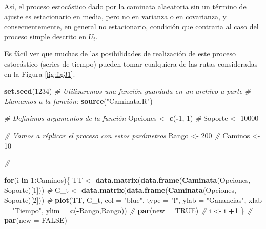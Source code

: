 \documentclass[
]{book}
\newenvironment{Shaded}{\begin{snugshade}}{\end{snugshade}}
\newcommand{\AttributeTok}[1]{\textcolor[rgb]{0.13,0.29,0.53}{#1}}
\newcommand{\CommentTok}[1]{\textcolor[rgb]{0.56,0.35,0.01}{\textit{#1}}}
\newcommand{\ConstantTok}[1]{\textcolor[rgb]{0.56,0.35,0.01}{#1}}
\newcommand{\ControlFlowTok}[1]{\textcolor[rgb]{0.13,0.29,0.53}{\textbf{#1}}}
\newcommand{\DecValTok}[1]{\textcolor[rgb]{0.00,0.00,0.81}{#1}}
\newcommand{\FunctionTok}[1]{\textcolor[rgb]{0.13,0.29,0.53}{\textbf{#1}}}
\newcommand{\NormalTok}[1]{#1}
\newcommand{\OtherTok}[1]{\textcolor[rgb]{0.56,0.35,0.01}{#1}}
\newcommand{\SpecialCharTok}[1]{\textcolor[rgb]{0.81,0.36,0.00}{\textbf{#1}}}
\newcommand{\StringTok}[1]{\textcolor[rgb]{0.31,0.60,0.02}{#1}}
\begin{document}
Así, el proceso estocástico dado por la caminata alaeatoria sin un término de ajuste es estacionario en media, pero no en varianza o en covarianza, y consecuentemente, en general no estacionario, condición que contraria al caso del proceso simple descrito en \(U_t\).

Es fácil ver que muchas de las posibilidades de realización de este proceso estocástico (series de tiempo) pueden tomar cualquiera de las rutas consideradas en la Figura \ref{fig:fig31}.

\begin{Shaded}
\begin{Highlighting}[]
\FunctionTok{set.seed}\NormalTok{(}\DecValTok{1234}\NormalTok{)}
\CommentTok{\# Utilizaremos una función guardada en un archivo a parte}
\CommentTok{\# Llamamos a la función:}
\FunctionTok{source}\NormalTok{(}\StringTok{"Caminata.R"}\NormalTok{)}

\CommentTok{\# Definimos argumentos de la función}
\NormalTok{Opciones }\OtherTok{\textless{}{-}} \FunctionTok{c}\NormalTok{(}\SpecialCharTok{{-}}\DecValTok{1}\NormalTok{, }\DecValTok{1}\NormalTok{)}
\CommentTok{\#}
\NormalTok{Soporte }\OtherTok{\textless{}{-}} \DecValTok{10000}

\CommentTok{\# Vamos a réplicar el proceso con estos parámetros}
\NormalTok{Rango }\OtherTok{\textless{}{-}} \DecValTok{200}
\CommentTok{\#}
\NormalTok{Caminos }\OtherTok{\textless{}{-}} \DecValTok{10}

\CommentTok{\#}

\ControlFlowTok{for}\NormalTok{(i }\ControlFlowTok{in} \DecValTok{1}\SpecialCharTok{:}\NormalTok{Caminos)\{}
\NormalTok{  TT }\OtherTok{\textless{}{-}} \FunctionTok{data.matrix}\NormalTok{(}\FunctionTok{data.frame}\NormalTok{(}\FunctionTok{Caminata}\NormalTok{(Opciones, Soporte)[}\DecValTok{1}\NormalTok{]))}
  \CommentTok{\#}
\NormalTok{  G\_t }\OtherTok{\textless{}{-}} \FunctionTok{data.matrix}\NormalTok{(}\FunctionTok{data.frame}\NormalTok{(}\FunctionTok{Caminata}\NormalTok{(Opciones, Soporte)[}\DecValTok{2}\NormalTok{]))}
  \CommentTok{\#}
  \FunctionTok{plot}\NormalTok{(TT, G\_t, }\AttributeTok{col =} \StringTok{"blue"}\NormalTok{, }\AttributeTok{type =} \StringTok{"l"}\NormalTok{, }\AttributeTok{ylab =} \StringTok{"Ganancias"}\NormalTok{, }
       \AttributeTok{xlab =} \StringTok{"Tiempo"}\NormalTok{, }\AttributeTok{ylim =} \FunctionTok{c}\NormalTok{(}\SpecialCharTok{{-}}\NormalTok{Rango,Rango))}
  \CommentTok{\#}
  \FunctionTok{par}\NormalTok{(}\AttributeTok{new =} \ConstantTok{TRUE}\NormalTok{)}
  \CommentTok{\#}
\NormalTok{  i }\OtherTok{\textless{}{-}}\NormalTok{ i }\SpecialCharTok{+}\DecValTok{1}
\NormalTok{\}}
\CommentTok{\#}
\FunctionTok{par}\NormalTok{(}\AttributeTok{new =} \ConstantTok{FALSE}\NormalTok{)}
\end{Highlighting}
\end{Shaded}
\end{document}
